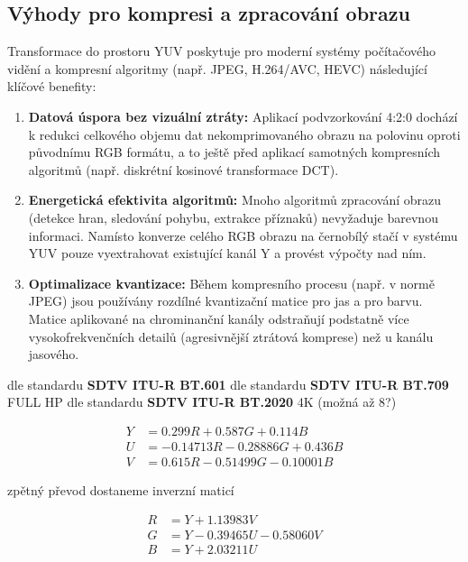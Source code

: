 \documentclass[FM,DP]{tulthesis}
\begin{document}
\subsection{Výhody pro kompresi a zpracování obrazu}

Transformace do prostoru YUV poskytuje pro moderní systémy počítačového vidění
a kompresní algoritmy (např. JPEG, H.264/AVC, HEVC) následující klíčové
benefity:

\begin{enumerate}
    \item \textbf{Datová úspora bez vizuální ztráty:} Aplikací podvzorkování 4:2:0 dochází k redukci celkového objemu dat nekomprimovaného obrazu na polovinu oproti původnímu RGB formátu, a to ještě před aplikací samotných kompresních algoritmů (např. diskrétní kosinové transformace DCT).
    \item \textbf{Energetická efektivita algoritmů:} Mnoho algoritmů zpracování obrazu (detekce hran, sledování pohybu, extrakce příznaků) nevyžaduje barevnou informaci. Namísto konverze celého RGB obrazu na černobílý stačí v systému YUV pouze vyextrahovat existující kanál Y a provést výpočty nad ním.
    \item \textbf{Optimalizace kvantizace:} Během kompresního procesu (např. v normě JPEG) jsou používány rozdílné kvantizační matice pro jas a pro barvu. Matice aplikované na chrominanční kanály odstraňují podstatně více vysokofrekvenčních detailů (agresivnější ztrátová komprese) než u kanálu jasového.
\end{enumerate}

dle standardu \textbf{SDTV ITU-R BT.601} dle standardu \textbf{SDTV ITU-R
    BT.709} FULL HP dle standardu \textbf{SDTV ITU-R BT.2020} 4K (možná až 8?)

\[\begin{aligned}
        Y & = 0.299R + 0.587G + 0.114B      \\
        U & = -0.14713R - 0.28886G + 0.436B \\
        V & = 0.615R - 0.51499G - 0.10001B
    \end{aligned}\]

zpětný převod dostaneme inverzní maticí

\[\begin{aligned}
        R & = Y + 1.13983V            \\
        G & = Y - 0.39465U - 0.58060V \\
        B & = Y + 2.03211U
    \end{aligned}\]
\end{document}
